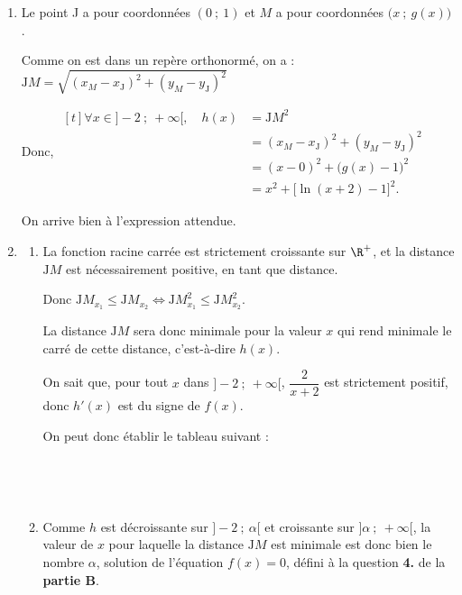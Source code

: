 \medskip

\begin{enumerate}
\item Le point J a pour coordonnées $(0~;~1)$ et $M$ a pour coordonnées $\big(x~;~g(x)\big)$.

Comme on est dans un repère orthonormé, on a :\quad $\mathrm{J}M = \sqrt{(x_M - x_\mathrm{J})^2 + (y_M - y_\mathrm{J})^2}$

Donc, \quad $\begin{aligned}[t] \forall x \in ]-2~;~+\infty[,\quad h(x)&=\mathrm{J}M^2\\
	&=(x_{M} - x_{\mathrm{J}})^2 + (y_{M} - y_{\mathrm{J}})^2\\
	&=(x - 0)^2 + \big(g(x) - 1\big)^2\\
	&=x^{2}+\big[\ln (x+2)-1\big]^{2}.\end{aligned}$

On arrive bien à l'expression attendue.

\item \begin{enumerate}
	\item La fonction racine carrée est strictement croissante sur $\R^+$, et la distance $\mathrm{J}M$ est nécessairement positive, en tant que distance.

Donc $\mathrm{J}M_{x_1} \leqslant \mathrm{J}M_{x_2} \iff \mathrm{J}M_{x_1}^2 \leqslant \mathrm{J}M_{x_2}^2$.

La distance $\mathrm{J}M$ sera donc minimale pour la valeur $x$ qui rend minimale le carré de cette distance, c'est-à-dire $h(x)$.
	
On sait que, pour tout $x$ dans $]-2~;~+\infty[$, $\dfrac{2}{x+2}$ est strictement positif, donc $h'(x)$ est du signe de $f(x)$.

On peut donc établir le tableau suivant :

	\hfill~\hfill~

	\item Comme $h$ est décroissante sur $]-2~;~\alpha[$ et croissante sur $]\alpha~;~+\infty[$, la valeur de $x$ pour laquelle la distance $\mathrm{J}M$ est minimale est donc bien le nombre $\alpha$, solution de l'équation $f(x) = 0$, défini à la question \textbf{4.} de la \textbf{partie B}.
\end{enumerate}


\end{enumerate}
